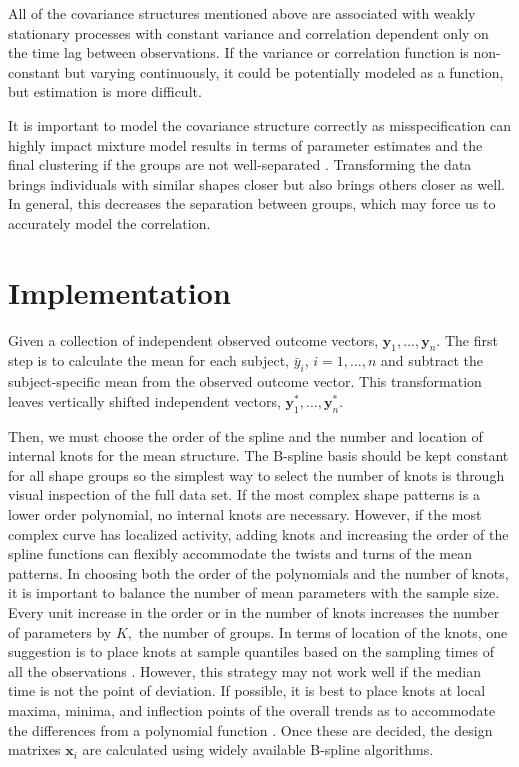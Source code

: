\documentclass[12pt]{article}
\newcommand{\B}[0]{\mathbf}
\begin{document}
All of the covariance structures mentioned above are associated with weakly stationary processes with constant variance and correlation dependent only on the time lag between observations. If the variance or correlation function is non-constant but varying continuously, it could be potentially modeled as a function, but estimation is more difficult.

It is important to model the covariance structure correctly as misspecification can highly impact mixture model results in terms of parameter estimates and the final clustering if the groups are not well-separated \cite{heggeseth2013}. Transforming the data brings individuals with similar shapes closer but also brings others closer as well. In general, this decreases the separation between groups, which may force us to accurately model the correlation. 

\section{Implementation}
Given a collection of independent observed outcome vectors, $\B y_{1},...,\B y_{n}$. The first step is to calculate the mean for each subject, $\bar{y}_{i}$, $i=1,...,n$ and subtract the subject-specific mean from the observed outcome vector. This transformation leaves vertically shifted independent vectors, $\B y^{*}_{1},...,\B y^{*}_{n}$.  

Then, we must choose the order of the spline and the number and location of internal knots for the mean structure. The B-spline basis should be kept constant for all shape groups so the simplest way to select the number of knots is through visual inspection of the full data set. If the most complex shape patterns is a lower order polynomial, no internal knots are necessary. However, if the most complex curve has localized activity, adding knots and increasing the order of the spline functions can flexibly accommodate the twists and turns of the mean patterns. In choosing both the order of the polynomials and the number of knots, it is important to balance the number of mean parameters with the sample size. Every unit increase in the order or in the number of knots increases the number of parameters by $K,$ the number of groups. In terms of location of the knots, one suggestion is to place knots at sample quantiles based on the sampling times of all the observations \cite{ruppert2002}. However, this strategy may not work well if the median time is not the point of deviation. If possible, it is best to place knots at local maxima, minima, and inflection points of the overall trends as to accommodate the differences from a polynomial function \cite{eubank1999}.  Once these are decided, the design matrixes $\B x_{i}$ are calculated using widely available B-spline algorithms. 
\end{document}
